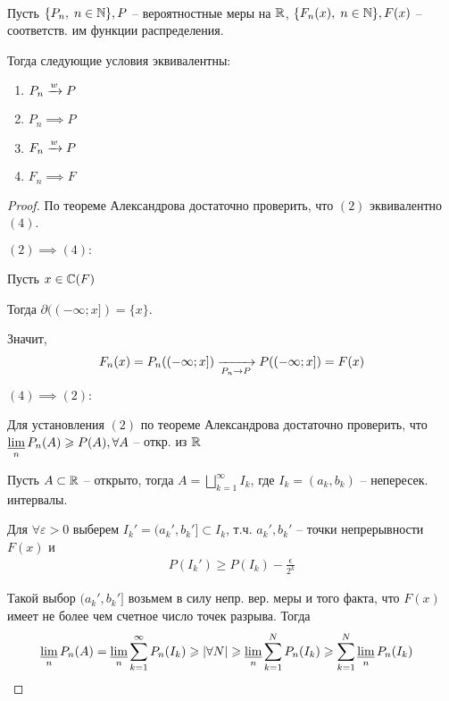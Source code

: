\begin{theorem}~

  Пусть $\{ P_n,\; n \in \mathbb{N} \}, P$ -- вероятностные меры на $\mathbb{R}$,
  $\{ F_n(x),\; n \in \mathbb{N} \}, F(x)$ -- соответств. им функции распределения. 

  Тогда следующие условия эквивалентны:
  \begin{enumerate}
    \item $P_n \xrightarrow{w} P$
    \item $P_n \implies P$
    \item $F_n \xrightarrow{w} P$
    \item $F_n \implies F$
  \end{enumerate}

  \begin{proof}
    По теореме Александрова достаточно проверить, что $(2)$ эквивалентно $(4)$.

    $(2) \implies (4):$ 

    Пусть $x \in \mathbb{C}(F)$

    Тогда $\partial((-\infty; x]) = \{ x \}$.

    Значит,
    \begin{align*}
      F_n(x) = P_n((-\infty; x]) \xrightarrow[P_n \to P]{} P((-\infty; x]) = F(x)
    \end{align*}

    $(4) \implies (2):$ 

    Для установления $(2)$ по теореме Александрова достаточно проверить, 
    что $\varliminf\limits_n P_n(A) \geqslant P(A), \forall A$ -- откр. из $\mathbb{R}$

    Пусть $A \subset \mathbb{R}$ -- открыто, 
    тогда $A = \bigsqcup\limits_{k = 1}^{\infty} I_k$, 
    где $I_k = (a_k, b_k)$ -- непересек. интервалы.

    Для $\forall \varepsilon > 0$
    выберем $I_{k}' = (a_{k}', b_{k}'] \subset I_{k}$,
    т.ч. $a_k', b_k'$ -- точки непрерывности $F(x)$ и
    \begin{align*}
      P(I_k') \geq P(I_k) - \frac{\epsilon}{2^k}
    \end{align*}

    Такой выбор $(a_k', b_k']$ возьмем в силу непр. вер. меры и того факта, 
    что $F(x)$ имеет не более чем счетное  число точек разрыва. 
    Тогда
    \begin{align*}
      &\varliminf\limits_n P_n(A) = \varliminf\limits_n \sum_{k = 1}^{\infty} P_n (I_k) \geqslant |\forall N|
      \geqslant \varliminf\limits_n \sum_{k = 1}^{N} P_n(I_k) \geqslant \sum_{k = 1}^{N} \varliminf\limits_n P_n(I_k)
    \end{align*}


\end{proof}
\end{theorem}
